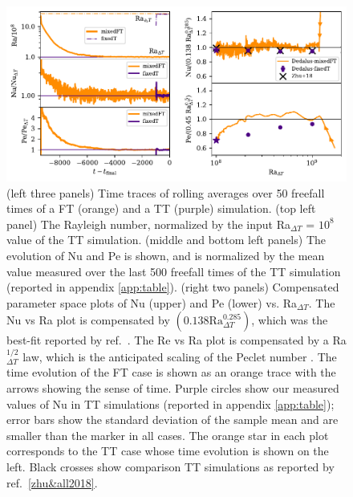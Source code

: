 \documentclass[aps, pre, onecolumn, nofootinbib, notitlepage, groupedaddress, amsfonts, amssymb, amsmath, longbibliography, superscriptaddress]{revtex4-1}
\begin{document}
\begin{figure}
\includegraphics[width=\textwidth]{./figs/rbc_scalar_comparisons.pdf}
\caption{ 
	(left three panels) Time traces of rolling averages over 50 freefall times of a FT (orange) and a TT (purple) simulation.
	(top left panel) The Rayleigh number, normalized by the input Ra$_{\Delta T}$ = $10^8$ value of the TT simulation.
	(middle and bottom left panels) The evolution of Nu and Pe is shown, and is normalized by the mean value measured over the last 500 freefall times of the TT simulation (reported in appendix \ref{app:table}).
	(right two panels) Compensated parameter space plots of Nu (upper) and Pe (lower) vs. Ra$_{\Delta T}$.
	The Nu vs Ra plot is compensated by $(0.138 \text{Ra}_{\Delta T}^{0.285})$, which was the best-fit reported by ref.~\cite{johnston&doering2009}.
	The Re vs Ra plot is compensated by a Ra$_{\Delta T}^{1/2}$ law, which is the anticipated scaling of the Peclet number \cite{ahlers&all2009}.
	The time evolution of the FT case is shown as an orange trace with the arrows showing the sense of time.
	Purple circles show our measured values of Nu in TT simulations (reported in appendix \ref{app:table}); error bars show the standard deviation of the sample mean and are smaller than the marker in all cases.
	The orange star in each plot corresponds to the TT case whose time evolution is shown on the left.
	Black crosses show comparison TT simulations as reported by ref.~\ref{zhu&all2018}.
\label{fig:rbc_scalar_comparisons} }
\end{figure}
\end{document}
